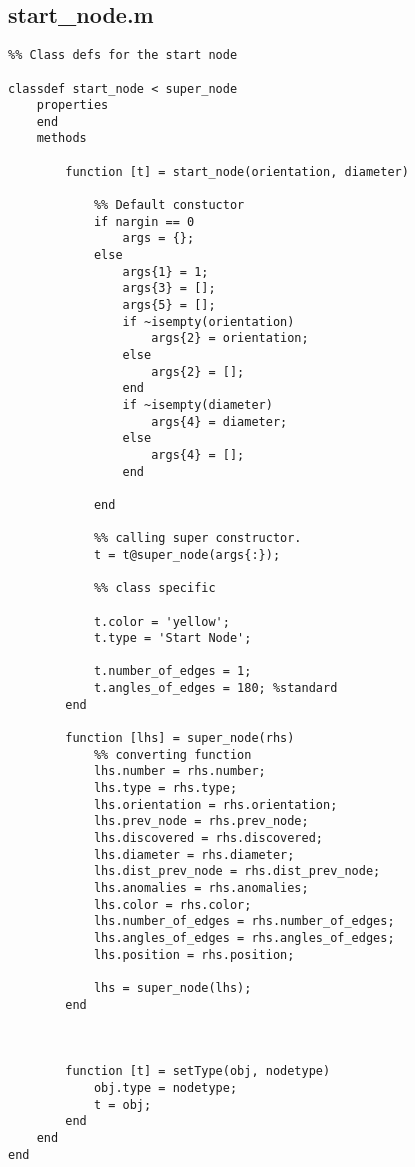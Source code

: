 \subsection{start\_node.m}

\begin{lstlisting}
%% Class defs for the start node
 
classdef start_node < super_node
    properties
    end
    methods
        
        function [t] = start_node(orientation, diameter)
            
            %% Default constuctor
            if nargin == 0
                args = {};
            else
                args{1} = 1;
                args{3} = [];
                args{5} = [];
                if ~isempty(orientation)
                    args{2} = orientation;
                else 
                    args{2} = [];
                end
                if ~isempty(diameter)
                    args{4} = diameter;
                else
                    args{4} = [];
                end
                
            end
            
            %% calling super constructor.
            t = t@super_node(args{:});
            
            %% class specific
            
            t.color = 'yellow';
            t.type = 'Start Node';
            
            t.number_of_edges = 1;
            t.angles_of_edges = 180; %standard  
        end
        
        function [lhs] = super_node(rhs)
            %% converting function
            lhs.number = rhs.number;
            lhs.type = rhs.type;
            lhs.orientation = rhs.orientation;
            lhs.prev_node = rhs.prev_node;
            lhs.discovered = rhs.discovered;
            lhs.diameter = rhs.diameter;
            lhs.dist_prev_node = rhs.dist_prev_node;
            lhs.anomalies = rhs.anomalies;
            lhs.color = rhs.color;
            lhs.number_of_edges = rhs.number_of_edges;
            lhs.angles_of_edges = rhs.angles_of_edges;
            lhs.position = rhs.position;
            
            lhs = super_node(lhs);            
        end
        
 
       
        function [t] = setType(obj, nodetype)
            obj.type = nodetype;
            t = obj;
        end
    end
end

\end{lstlisting}


